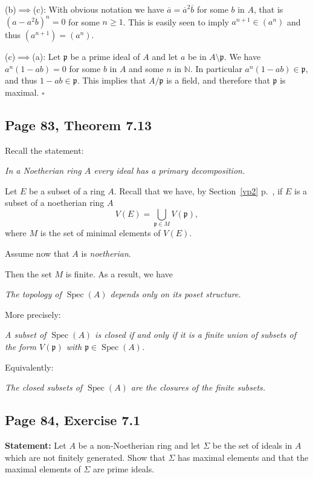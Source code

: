 \documentclass[parskip=half,fontsize=12pt]{scrartcl}%
\newcommand{\mf}{\mathfrak}
\newcommand{\ppp}{\mf p}
\newcommand{\bu}{\bullet}
\newcommand{\Spec}{\operatorname{Spec}}\newcommand{\Sp}{\operatorname{Spec}}
\begin{document}
(b)$\implies$(c): With obvious notation we have $\overline a=\overline a^2\overline b$ for some $b$ in $A$, that is $(a-a^2b)^n=0$ for some $n\ge1$. This is easily seen to imply $a^{n+1}\in(a^n)$ and thus $(a^{n+1})=(a^n)$. 

(c)$\implies$(a): Let $\ppp$ be a prime ideal of $A$ and let $a$ be in $A\setminus\ppp$. We have $a^n(1-ab)=0$ for some $b$ in $A$ and some $n$ in $\mathbb N$. In particular $a^n(1-ab)\in\ppp$, and thus $1-ab\in\ppp$. This implies that $A/\ppp$ is a field, and therefore that $\ppp$ is maximal. $\square$

\subsection{Page 83, Theorem 7.13}%

Recall the statement:

\emph{In a Noetherian ring $A$ every ideal has a primary decomposition.}

Let $E$ be a subset of a ring $A$. Recall that we have, by Section~\ref{vp2} p.~\pageref{vp2}, if $E$ is a subset of a noetherian ring $A$ 
$$
V(E)=\bigcup_{\ppp\in M}V(\ppp),
$$ 
where $M$ is the set of minimal elements of $V(E)$. 

Assume now that $A$ is \emph{noetherian}. 

Then the set $M$ is finite. As a result, we have %

\emph{The topology of $\Spec(A)$ depends only on its poset structure.}

More precisely:

\emph{A subset of $\Spec(A)$ is closed if and only if it is a finite union of subsets of the form $V(\ppp)$ with $\ppp\in\Spec(A)$.}

Equivalently:

\emph{The closed subsets of $\Spec(A)$ are the closures of the finite subsets.}



\subsection{Page 84, Exercise 7.1}%

\textbf{Statement:} Let $A$ be a non-Noetherian ring and let $\Sigma$ be the set of ideals in $A$ which are not finitely generated. Show that $\Sigma$ has maximal elements and that the maximal elements of $\Sigma$ are prime ideals.
\end{document}
